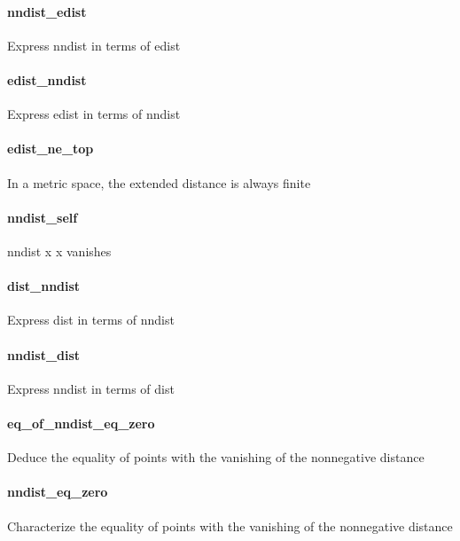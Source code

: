 \documentclass{article}
\begin{document}
\paragraph{nndist\_edist}
\par
Express 
\colorbox[RGB]{253,246,227}{{{{\color[RGB]{101, 123, 131} nndist }}}} in terms of 
\colorbox[RGB]{253,246,227}{{{{\color[RGB]{101, 123, 131} edist }}}}\paragraph{edist\_nndist}
\par
Express 
\colorbox[RGB]{253,246,227}{{{{\color[RGB]{101, 123, 131} edist }}}} in terms of 
\colorbox[RGB]{253,246,227}{{{{\color[RGB]{101, 123, 131} nndist }}}}\paragraph{edist\_ne\_top}
\par
In a metric space, the extended distance is always finite
\paragraph{nndist\_self}
\par
\colorbox[RGB]{253,246,227}{{{{\color[RGB]{101, 123, 131} nndist x x }}}} vanishes
\paragraph{dist\_nndist}
\par
Express 
\colorbox[RGB]{253,246,227}{{{{\color[RGB]{101, 123, 131} dist }}}} in terms of 
\colorbox[RGB]{253,246,227}{{{{\color[RGB]{101, 123, 131} nndist }}}}\paragraph{nndist\_dist}
\par
Express 
\colorbox[RGB]{253,246,227}{{{{\color[RGB]{101, 123, 131} nndist }}}} in terms of 
\colorbox[RGB]{253,246,227}{{{{\color[RGB]{101, 123, 131} dist }}}}\paragraph{eq\_of\_nndist\_eq\_zero}
\par
Deduce the equality of points with the vanishing of the nonnegative distance
\paragraph{nndist\_eq\_zero}
\par
Characterize the equality of points with the vanishing of the nonnegative distance
\end{document}
